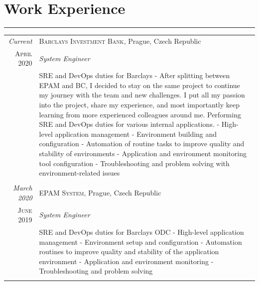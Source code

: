 \documentclass[a4paper,10pt]{article}
\begin{document}
\section*{Work Experience}
\vspace{-0.5ex}%
\rule{\textwidth}{0.3pt}
\vspace{-0.5ex}%
\begin{longtable}{r|p{11cm}}
\emph{Current} & \textsc{Barclays Investment Bank}, Prague, Czech Republic\\
\textsc{April 2020} & \emph{System Engineer}\\ 
& \footnotesize{\textnormal{SRE and DevOps duties for Barclays\newline
- After splitting between EPAM and BC, I decided to stay on the same project to continue my journey with the team and new challenges. I put all my passion into the project, share my experience, and most importantly keep learning from more experienced colleagues around me. Performing SRE and DevOps duties for various internal applications.\newline
- High-level application management\newline
- Environment building and configuration\newline
- Automation of routine tasks to improve quality and stability of environments\newline
- Application and environment monitoring tool configuration\newline
- Troubleshooting and problem solving with environment-related issues}}\\
\multicolumn{2}{c}{} \\
  \emph{March 2020} & \textsc{EPAM System}, Prague, Czech Republic \\
\textsc{June 2019} & \emph{System Engineer}\\ 
& \footnotesize{\textnormal{SRE and DevOps duties for Barclays ODC\newline
- High-level application management\newline
- Environment setup and configuration\newline
- Automation routines to improve quality and stability of the application environment\newline
- Application and environment monitoring\newline
- Troubleshooting and problem solving}}\\
\multicolumn{2}{c}{} \\

\end{longtable}
\end{document}
